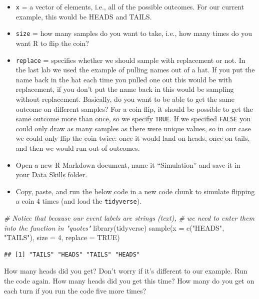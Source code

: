 \documentclass[
  oneside]{book}
\newenvironment{Shaded}{\begin{snugshade}}{\end{snugshade}}
\newcommand{\AttributeTok}[1]{\textcolor[rgb]{0.77,0.63,0.00}{#1}}
\newcommand{\CommentTok}[1]{\textcolor[rgb]{0.56,0.35,0.01}{\textit{#1}}}
\newcommand{\ConstantTok}[1]{\textcolor[rgb]{0.00,0.00,0.00}{#1}}
\newcommand{\DecValTok}[1]{\textcolor[rgb]{0.00,0.00,0.81}{#1}}
\newcommand{\FunctionTok}[1]{\textcolor[rgb]{0.00,0.00,0.00}{#1}}
\newcommand{\NormalTok}[1]{#1}
\newcommand{\StringTok}[1]{\textcolor[rgb]{0.31,0.60,0.02}{#1}}
\begin{document}
\begin{itemize}
\item
  \texttt{x} = a vector of elements, i.e., all of the possible outcomes. For our current example, this would be HEADS and TAILS.\\
\item
  \texttt{size} = how many samples do you want to take, i.e., how many times do you want R to flip the coin?\\
\item
  \texttt{replace} = specifies whether we should sample with replacement or not. In the last lab we used the example of pulling names out of a hat. If you put the name back in the hat each time you pulled one out this would be with replacement, if you don't put the name back in this would be sampling without replacement. Basically, do you want to be able to get the same outcome on different samples? For a coin flip, it should be possible to get the same outcome more than once, so we specify \texttt{TRUE}. If we specified \texttt{FALSE} you could only draw as many samples as there were unique values, so in our case we could only flip the coin twice: once it would land on heads, once on tails, and then we would run out of outcomes.
\item
  Open a new R Markdown document, name it ``Simulation'' and save it in your Data Skills folder.
\item
  Copy, paste, and run the below code in a new code chunk to simulate flipping a coin 4 times (and load the \texttt{tidyverse}).
\end{itemize}

\begin{Shaded}
\begin{Highlighting}[]
\CommentTok{\# Notice that because our event labels are strings (text), }
\CommentTok{\# we need to enter them into the function in "quotes" }
\FunctionTok{library}\NormalTok{(tidyverse)}
\FunctionTok{sample}\NormalTok{(}\AttributeTok{x =} \FunctionTok{c}\NormalTok{(}\StringTok{"HEADS"}\NormalTok{, }\StringTok{"TAILS"}\NormalTok{), }\AttributeTok{size =} \DecValTok{4}\NormalTok{, }\AttributeTok{replace =} \ConstantTok{TRUE}\NormalTok{) }
\end{Highlighting}
\end{Shaded}

\begin{verbatim}
## [1] "TAILS" "HEADS" "TAILS" "HEADS"
\end{verbatim}

How many heads did you get? Don't worry if it's different to our example. Run the code again. How many heads did you get this time? How many do you get on each turn if you run the code five more times?
\end{document}
